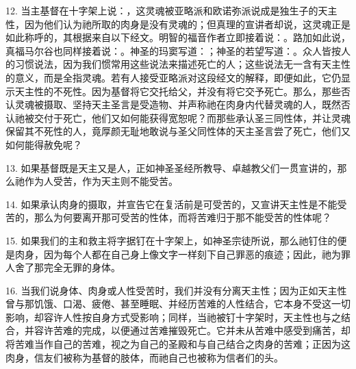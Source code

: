 12. 当主基督在十字架上说：，这灵魂被亚略派和欧诺弥派说成是独生子的天主性，因为他们认为祂所取的肉身是没有灵魂的；但真理的宣讲者却说，这灵魂正是如此称呼的，其根据来自以下经文。明智的福音作者立即接着说：。路加如此说，真福马尔谷也同样接着说：。神圣的玛窦写道：；神圣的若望写道：。众人皆按人的习惯说法，因为我们惯常用这些说法来描述死亡的人；这些说法无一含有天主性的意义，而是全指灵魂。若有人接受亚略派对这段经文的解释，即便如此，它仍显示天主性的不死性。因为基督将它交托给父，并没有将它交予死亡。那么，那些否认灵魂被摄取、坚持天主圣言是受造物、并声称祂在肉身内代替灵魂的人，既然否认祂被交付于死亡，他们又如何能获得宽恕呢？而那些承认圣三同性体，并让灵魂保留其不死性的人，竟厚颜无耻地敢说与圣父同性体的天主圣言尝了死亡，他们又如何能得赦免呢？\par

13. 如果基督既是天主又是人，正如神圣圣经所教导、卓越教父们一贯宣讲的，那么祂作为人受苦，作为天主则不能受苦。\par

14. 如果承认肉身的摄取，并宣告它在复活前是可受苦的，又宣讲天主性是不能受苦的，那么为何要离开那可受苦的性体，而将苦难归于那不能受苦的性体呢？\par

15. 如果我们的主和救主将字据钉在十字架上，如神圣宗徒所说，那么祂钉住的便是肉身，因为每个人都在自己身上像文字一样刻下自己罪恶的痕迹；因此，祂为罪人舍了那完全无罪的身体。\par

16. 当我们说身体、肉身或人性受苦时，我们并没有分离天主性；因为正如天主性曾与那饥饿、口渴、疲倦、甚至睡眠、并经历苦难的人性结合，它本身不受这一切影响，却容许人性按自身方式受影响；同样，当祂被钉十字架时，天主性也与之结合，并容许苦难的完成，以便通过苦难摧毁死亡。它并未从苦难中感受到痛苦，却将苦难当作自己的苦难，视之为自己的圣殿和与自己结合之肉身的苦难；正因为这肉身，信友们被称为基督的肢体，而祂自己也被称为信者们的头。\par

